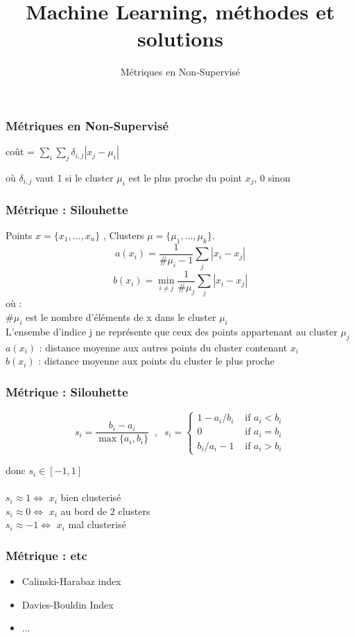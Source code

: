 \documentclass{formation}
\title{Machine Learning, méthodes et solutions}
\subtitle{Métriques en Non-Supervisé}
\begin{document}
\maketitle

\begin{frame}
  \frametitle{Métriques en Non-Supervisé}
  \begin{center}
    coût = $\sum_i \sum_j \delta_{i,j}\left| x_j - \mu_i \right|$
  \end{center}
  où $\delta_{i,j}$ vaut 1 si le cluster $\mu_i$ est le plus proche du point $x_j$, 0 sinon
\end{frame}

\begin{frame}
  \frametitle{Métrique : Silouhette}
  Points $x = \{x_1, \dotsc, x_n\}$ , Clusters $\mu = \{\mu_1, \dotsc, \mu_k\}$. \\
  \[
  \boxed{a(x_i) = \frac{1}{\#\mu_i-1}\sum_j |x_i - x_j|}
  \]
  \[
  \boxed{b(x_i) = \min_{i \neq j} \frac{1}{\#\mu_j}\sum_j |x_i - x_j|}
  \]
  où : \\
  $\#\mu_i$ est le nombre d'éléments de x dans le cluster $\mu_i$ \\
  L'ensembe d'indice j ne représente que ceux des points appartenant au cluster $\mu_j$ \\
  $a(x_i)$ : distance moyenne aux autres points du cluster contenant $x_i$ \\
  $b(x_i)$ : distance moyenne aux points du cluster le plus proche
  
\end{frame}

\begin{frame}
  \frametitle{Métrique : Silouhette}
  
  \begin{center}
    \[
    s_i = \frac{b_i - a_i}{\max\{a_i, b_i\}}\;\;,\;\;
    s_i = \left\{
    \begin{array}{ll}
      1 - a_i/b_i & \mbox{ if } a_i < b_i \\[2mm]
      0 & \mbox{ if } a_i = b_i \\[2mm]
      b_i / a_i - 1 & \mbox{ if } a_i > b_i
    \end{array}\right.
    \]
    
  \end{center}
  donc $s_i \in [-1, 1]$ \\
  \\
  $s_i \approx 1 \iff$ $x_i$ bien clusterisé \\
  $s_i \approx 0 \iff$ $x_i$ au bord de 2 clusters\\
  $s_i \approx -1 \iff$ $x_i$ mal clusterisé
\end{frame}

\begin{frame}
  \frametitle{Métrique : etc}
  \begin{itemize}
  \item Calinski-Harabaz index
  \item Davies-Bouldin Index
  \item ...
  \end{itemize}
\end{frame}
\end{document}
